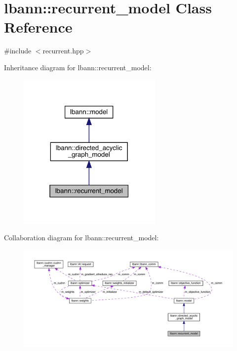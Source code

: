 \hypertarget{classlbann_1_1recurrent__model}{}\section{lbann\+:\+:recurrent\+\_\+model Class Reference}
\label{classlbann_1_1recurrent__model}


{\ttfamily \#include $<$recurrent.\+hpp$>$}



Inheritance diagram for lbann\+:\+:recurrent\+\_\+model\+:\nopagebreak
\begin{figure}[H]
\begin{center}
\leavevmode
\includegraphics[width=199pt]{classlbann_1_1recurrent__model__inherit__graph}
\end{center}
\end{figure}


Collaboration diagram for lbann\+:\+:recurrent\+\_\+model\+:\nopagebreak
\begin{figure}[H]
\begin{center}
\leavevmode
\includegraphics[width=350pt]{classlbann_1_1recurrent__model__coll__graph}
\end{center}
\end{figure}
